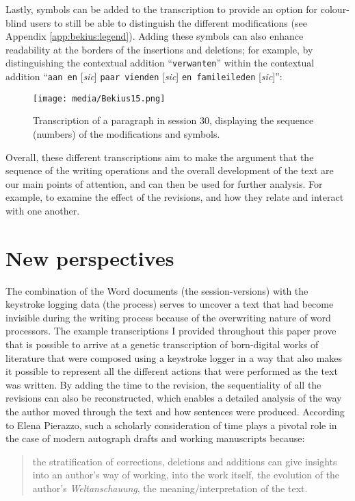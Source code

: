 \begin{paper}
\noindent Lastly, symbols can be added to the transcription to provide an
option for colour-blind users to still be able to distinguish the different
modifications (see Appendix \ref{app:bekius:legend}).
Adding these symbols can also enhance readability at the borders of the
insertions and deletions; for example, by distinguishing the contextual
addition ``\verb|verwanten|'' within the contextual addition ``\verb|aan en| [\emph{sic}] \verb|paar vienden| [\emph{sic}] \verb|en famileileden| [\emph{sic}]'':

\begin{figure}[H]
    \centering
    \texttt{[image: media/Bekius15.png]}
    \caption{Transcription of a paragraph in session 30, displaying the
sequence (numbers) of the modifications and symbols.}
    \label{fig:bekius:latensymbols}
\end{figure}

\noindent Overall, these different transcriptions aim to make the argument that the
sequence of the writing operations and the overall development of the
text are our main points of attention, and can then be used for further
analysis. For example, to examine the effect of the revisions, and how they relate and interact with one another.

\section{New perspectives}

The combination of the Word documents (the session-versions) with the
keystroke logging data (the process) serves to uncover a text that had become
invisible during the writing process because of the
overwriting nature of word processors. The example transcriptions I provided throughout this paper prove that is possible to arrive at a genetic transcription of born-digital works of literature that were composed using a keystroke logger in a way
that also makes it possible to represent all the different actions that were performed as the text was written. By adding the time to the revision, the
sequentiality of all the revisions can also be reconstructed, which
enables a detailed analysis of the way the author moved through the text and how
sentences were produced. According to Elena Pierazzo, such a scholarly
consideration of time plays a pivotal role in the case of modern
autograph drafts and working manuscripts because: 

\newpage
\begin{quote}
the stratification of corrections, deletions and additions can give insights into an author's way of working, into the work itself, the evolution of the author's \emph{Weltanschauung}, the meaning/interpretation of the text.
\begin{flushright}
\citep[171]{pierazzo_digital_2009}
\end{flushright}
\end{quote}


\end{paper}
